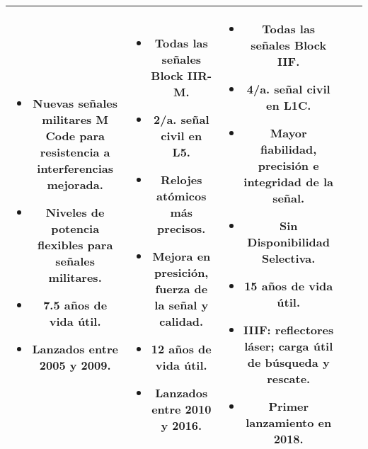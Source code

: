 \begin{center}
\begin{longtable}{|c|c|c|c|c|}
{{\begin{itemize}[leftmargin=*]
                    \item Nuevas señales militares M Code para resistencia a interferencias mejorada.
                    \item Niveles de potencia flexibles para señales militares.
                    \item 7.5 años de vida útil.
                    \item Lanzados entre 2005 y 2009.
                \end{itemize}
            }
        } &
        \parbox[t]{2.5cm}{
            {\fontsize{9}{11}\selectfont
                \begin{itemize}[leftmargin=*]
                    \item Todas las señales Block IIR-M.
                    \item 2/a. señal civil en L5.
                    \item Relojes atómicos más precisos.
                    \item Mejora en presición, fuerza de la señal y calidad.
                    \item 12 años de vida útil.
                    \item Lanzados entre 2010 y 2016.
                \end{itemize}
            }
        } &
        \parbox[t]{2.5cm}{
            {\fontsize{9}{11}\selectfont
                \begin{itemize}[leftmargin=*]
                    \item Todas las señales Block IIF.
                    \item 4/a. señal civil en L1C.
                    \item Mayor fiabilidad, precisión e integridad de la señal.
                    \item Sin Disponibilidad Selectiva.
                    \item 15 años de vida útil.
                    \item IIIF: reflectores láser; carga útil de búsqueda y rescate.
                    \item Primer lanzamiento en 2018.
                \end{itemize}
                \vspace{5pt}
            }
        } \\
        \hline
    \end{longtable}
\end{center}

